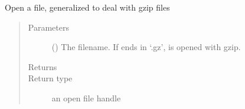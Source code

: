 \documentclass[letterpaper,10pt,english]{sphinxmanual}
\begin{document}
\begin{fulllineitems}
\label{\detokenize{omicidx.sra_parsers:omicidx.sra_parsers.models_from_runbrowser}}
\end{fulllineitems}


\begin{fulllineitems}
\label{\detokenize{omicidx.sra_parsers:omicidx.sra_parsers.open_file}}
Open a file, generalized to deal with gzip files
\begin{quote}\begin{description}
\item[{Parameters}] \leavevmode
{} () \textendash{} The filename. If ends in ‘.gz’, is opened with
gzip.

\item[{Returns}] \leavevmode


\item[{Return type}] \leavevmode
an open file handle

\end{description}\end{quote}

\end{fulllineitems}


\begin{fulllineitems}
\label{\detokenize{omicidx.sra_parsers:omicidx.sra_parsers.parse_addons_info}}
\end{fulllineitems}

\end{document}
